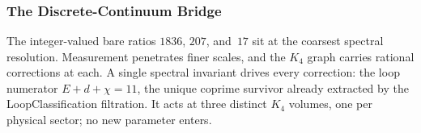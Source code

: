 \documentclass[11pt,a4paper]{book}
\def\texttt#1{#1}%
\begin{document}
\begin{code}
%
\\[\AgdaEmptyExtraSkip]%
\>[0]\<%
\\
\>[0]\AgdaSpace{}%
\AgdaSymbol{:}\AgdaSpace{}%
\AgdaSpace{}%
\AgdaSpace{}%
\<%
\\
\>[0]\AgdaSpace{}%
\AgdaSymbol{=}\AgdaSpace{}%
\<%
\\
%
\\[\AgdaEmptyExtraSkip]%
\>[0]\AgdaSpace{}%
\AgdaSymbol{:}\AgdaSpace{}%
\AgdaSpace{}%
\AgdaSpace{}%
\<%
\\
\>[0]\AgdaSpace{}%
\AgdaSymbol{=}\AgdaSpace{}%
\<%
\\
%
\\[\AgdaEmptyExtraSkip]%
\>[0]\<%
\\
\>[0]\AgdaSpace{}%
\AgdaSymbol{:}\AgdaSpace{}%
\<%
\\
\>[0]\AgdaSpace{}%
\AgdaSymbol{=}\AgdaSpace{}%
\AgdaSpace{}%
\AgdaOperator{\AgdaPrimitive{*}}\AgdaSpace{}%
%
\>[56]\<%
\\
%
\\[\AgdaEmptyExtraSkip]%
\>[0]\AgdaSpace{}%
\AgdaSymbol{:}\AgdaSpace{}%
\AgdaSpace{}%
\AgdaSpace{}%
\<%
\\
\>[0]\AgdaSpace{}%
\AgdaSymbol{=}\AgdaSpace{}%
\<%
\end{code}

\subsubsection*{The Discrete-Continuum Bridge}

The integer-valued bare ratios $1836$, $207$, and~$17$ sit at the coarsest
spectral resolution.  Measurement penetrates finer scales, and the $K_4$ graph
carries rational corrections at each.  A single spectral invariant drives every
correction: the loop numerator $E + d + \chi = 11$, the unique coprime survivor
already extracted by the \texttt{LoopClassification} filtration.  It acts at three
distinct $K_4$ volumes, one per physical sector; no new parameter enters.
\end{document}
